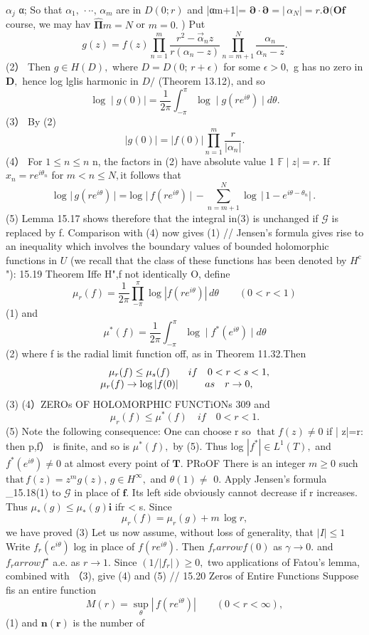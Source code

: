 $\alpha_{j}$ α; So that $\alpha_{1},\,\cdot\cdot\cdot,\,\alpha_{m}$ are in $D(0;r)$ and |αm+1|= $\mathbf{\partial}\cdot\mathbf{\partial}=\left|\,\alpha_{N}\right|=r.\mathbf{\partial}(\mathbf{Of}$ course, we may hav $\mathbf{\hat{\Pi}}m=N$ or $m=0.$ ) Put $$ g(z)=f(z)\prod_{n=1}^{m}\frac{r^{2}-\vec{\alpha}_{n}z}{r(\alpha_{n}-z)}\prod_{n=m+1}^{N}\frac{\alpha_{n}}{\alpha_{n}-z}. $$ (2） Then $g\in H(D),$ where $D=D(0;\,r+\epsilon)$ for some $\scriptstyle\epsilon>0,$ g has no zero in ${\boldsymbol{D}},$ hence log lglis harmonic in $D\!\!\!\!/$ (Theorem 13.12), and so $$ \log\mid g(0)\mid=\frac{1}{2\pi}\int_{-\pi}^{\pi}\log\mid g(r e^{i\theta})\mid d\theta. $$ (3） By (2) $$ |g(0)|=|f(0)|\prod_{n=1}^{m}{\frac{r}{|\alpha_{n}|}}. $$ (4） For $1\leq n\leq n$ n, the factors in (2) have absolute value 1 $\mathbb{F}\mid z\mid=r.$ If $x_{n}=r e^{i\theta_{n}}$ for $m<n\leq N,{\mathrm{it}}$ follows that $$ \mathrm{log}\,\,\vert\,g(r e^{i\theta})\,\vert=\mathrm{log}\,\,\vert\,f(r e^{i\theta})\,\vert\,-\sum_{n=m+1}^{N}\log\,\vert\,1-e^{i\theta-\theta_{n}}\vert\,. $$ (5) Lemma 15.17 shows therefore that the integral in(3) is unchanged if $\scriptstyle{\mathcal{G}}$ is replaced by f. Comparison with (4) now gives (1) // Jensen's formula gives rise to an inequality which involves the boundary values of bounded holomorphic functions in $U$ (we recall that the class of these functions has been denoted by $H^{\mathrm{{c}}}$ "): 15.19 Theorem Iffe H",f not identically O, define $$ \mu_{r}(f)={\frac{1}{2\pi}}\prod_{-\pi}^{\pi}\log\left|f(r e^{i\theta})\right|\,d\theta\qquad(0<r<1) $$ (1) and $$ \mu^{\ast}(f)=\frac{1}{2\pi}\int_{-\pi}^{\pi}\log\mid f^{\ast}(e^{i\theta})\mid d\theta $$ (2) where f is the radial limit function off, as in Theorem 11.32.Then $$ \begin{array}{c c c}{{\mu_{r}(f)\leq\mu_{s}(f)}}&{{i f\quad0<r<s<1,}}\\ {{\mu_{r}(f)\to\log\vert f(0)\vert}}&{{a s\quad r\to0,}}\end{array} $$ (3) (4）ZEROs OF HOLOMORPHIC FUNCTiONs 309 and $$ \mu_{r}(f)\leq\mu^{*}(f)\quad i f\quad0<r<1. $$ (5) Note the following consequence: One can choose r so $\operatorname{that}f(z)\neq0$ if | z|=r: then p,f） is finite, and so is $\mu^{*}(f),$ by (5). Thus log $|f^{*}|\in L^{1}(T),$ and $f^{*}(e^{i\theta})\neq0$ at almost every point of ${\boldsymbol{T}}.$ PRoOF There is an integer $\scriptstyle m\geq0$ such $\mathrm{that}\,f(z)=z^{m}g(z),\,g\in H^{\infty},$ and $\scriptstyle{\theta(1)\neq}$ 0. Apply Jensen's formula _15.18(1) to $\scriptstyle{\mathcal{G}}$ in place of ${\boldsymbol{f}}.$ Its left side obviously cannot decrease if r increases. Thus $\mu_{*}(g)\leq\mu_{*}(g)\mathbf{i}$ ifr < s. Since $$ \mu_{r}(f)=\mu_{r}(g)+m\,\log r, $$ we have proved (3) Let us now assume, without loss of generality, that $|I|\leq1$ Write $f_{r}(e^{i\theta})$ log in place of $f(r e^{i\theta}).$ Then $f_{r} arrow f(0)$ as $\scriptstyle\gamma\to0.$ and $f_{r} arrow f^{\star}$ a.e. as $r\to1.$ Since $(1/|f_{r}|)\geq0,$ two applications of Fatou's lemma, combined with （3), give (4) and (5) // 15.20 Zeros of Entire Functions Suppose fis an entire function $$ M(r)=\operatorname*{sup}_{\theta}\left|\,f(r e^{i\theta})\right|\qquad(0<r<\infty), $$ (1) and ${\boldsymbol{n}}({\boldsymbol{r}})$ is the number of 